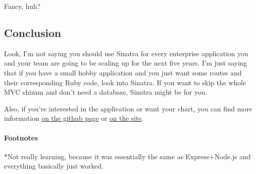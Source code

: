 Fancy, huh?

\subsection{Conclusion}\label{conclusion}

Look, I'm not saying you should use Sinatra for every enterprise
application you and your team are going to be scaling up for the next
five years. I'm just saying that if you have a small hobby application
and you just want some routes and their corresponding Ruby code, look
into Sinatra. If you want to skip the whole MVC shizam and don't need a
database, Sinatra might be for you.

Also, if you're interested in the application or want your chart, you
can find more information
\href{https://github.com/2016rshah/githubchart-api}{on the github page}
or \href{http://ghchart.rshah.org/}{on the site}.

\paragraph{Footnotes}\label{footnotes}

*Not really learning, because it was essentially the same as
Express+Node.js and everything basically just worked.
